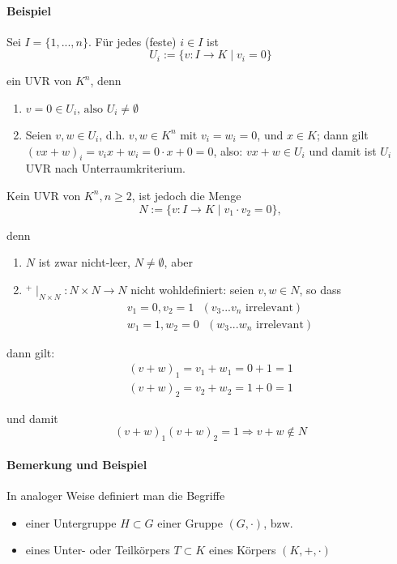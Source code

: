 \paragraph{Beispiel}
	Sei $I=\{1,...,n\}$. Für jedes (feste) $i\in I$ ist
	\begin{equation*}
		U_i := \{v:I\to K\mid v_i =0\}
	\end{equation*}

	ein UVR von $K^n$, denn
	\begin{enumerate}
		\item $v = 0 \in U_i\text{, also } U_i \neq \emptyset$
		\item Seien $v,w\in U_i$, d.h. $v,w\in K^n$ mit $v_i =w_i =0$, und $x\in K$; dann gilt $(vx+w)_i = v_ix+ w_i = 0\cdot x + 0 = 0$, also: $vx+w\in U_i$ und damit ist $U_i$ UVR nach Unterraumkriterium.  
	\end{enumerate}
	
	Kein UVR von $K^n, n\geq 2$, ist jedoch die Menge
	\begin{equation*}
		N:=\{v:I\to K\mid v_1\cdot v_2 = 0\},
	\end{equation*}
  
	denn 
	\begin{enumerate}
		\item $N$ ist zwar nicht-leer, $N\neq \emptyset$, aber
		\item $^+\mid_{N\times N}: N\times N\to N$ nicht wohldefiniert: seien $v,w\in N$, so dass
			\begin{gather*}
				v_1=0, v_2=1\text{ }(v_3 ... v_n \text{ irrelevant})\\
				w_1=1, w_2 = 0\text{ }(w_3 ... w_n \text{ irrelevant})
			\end{gather*}
	\end{enumerate}
	
	dann gilt:
	\begin{gather*}
		(v+w)_1 = v_1 + w_1 = 0+1=1\\
		(v+w)_2 = v_2 + w_2 = 1+0 = 1
	\end{gather*}

	und damit
	\begin{equation*}
		(v+w)_1(v+w)_2 = 1 \Rightarrow v+w\notin N
	\end{equation*}

\paragraph{Bemerkung und Beispiel}
	In analoger Weise definiert man die Begriffe
	\begin{itemize}
		\item einer Untergruppe $H\subset G$ einer Gruppe $(G,\cdot)$, bzw.
		\item eines Unter- oder Teilkörpers $T\subset K$ eines Körpers $(K,+,\cdot )$
	\end{itemize}
	
